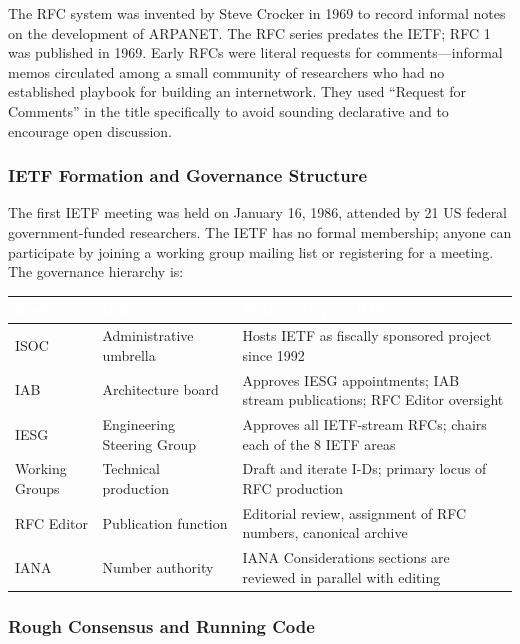 \documentclass[11pt,letterpaper]{article}
\newcommand{\tableheader}[1]{\textbf{\sffamily\textcolor{white}{#1}}}
\begin{document}
The RFC system was invented by Steve Crocker in 1969 to record informal notes on the development of ARPANET. The RFC series predates the IETF; RFC 1 was published in 1969. Early RFCs were literal requests for comments---informal memos circulated among a small community of researchers who had no established playbook for building an internetwork. They used ``Request for Comments'' in the title specifically to avoid sounding declarative and to encourage open discussion.

\subsubsection{IETF Formation and Governance Structure}

The first IETF meeting was held on January 16, 1986, attended by 21 US federal government-funded researchers. The IETF has no formal membership; anyone can participate by joining a working group mailing list or registering for a meeting. The governance hierarchy is:

\begin{center}
\begin{tabularx}{\textwidth}{L{3cm}L{3cm}X}
\toprule
{}
\tableheader{Body} & \tableheader{Role} & \tableheader{Relationship to RFCs} \\
\midrule
ISOC & Administrative umbrella & Hosts IETF as fiscally sponsored project since 1992 \\
IAB & Architecture board & Approves IESG appointments; IAB stream publications; RFC Editor oversight \\
IESG & Engineering Steering Group & Approves all IETF-stream RFCs; chairs each of the 8 IETF areas \\
Working Groups & Technical production & Draft and iterate I-Ds; primary locus of RFC production \\
RFC Editor & Publication function & Editorial review, assignment of RFC numbers, canonical archive \\
IANA & Number authority & IANA Considerations sections are reviewed in parallel with editing \\
\bottomrule
\end{tabularx}
\end{center}

\subsubsection{Rough Consensus and Running Code}
\end{document}

